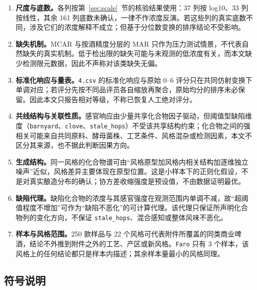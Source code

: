 \documentclass[UTF8,a4paper,zihao=-4]{ctexart}
\numberwithin{figure}{section}
\numberwithin{table}{section}
\numberwithin{equation}{section}
\newcommand{\file}[1]{\texttt{#1}}
\begin{document}
\begin{enumerate}[label=\textbf{\arabic*},leftmargin=3em,itemsep=2pt,topsep=2pt,parsep=0pt]
 
  \item \textbf{尺度与底数。}各列按第~\ref{sec:scale}~节的核验结果使用：37 列按 log10、33 列按线性，其余 161 列底数未确认，一律不作浓度反演。若这些列的真实底数不同，涉及它们的浓度解释不成立；但基于分位数变换的排序结论不受影响。

  \item \textbf{缺失机制。}MCAR 与按酒精度分层的 MAR 只作为压力测试情景，不代表自然缺失的真实机制。低于检出限的缺失可能与未观测的低浓度有关，而本文缺少检测限元数据，因此不声称对该类缺失无偏。

  \item \textbf{标准化响应与量表。}\file{4.csv} 的标准化响应与原始 0--6 评分只在共同仿射变换下单调对应；若评分先按不同品评员各自缩放再聚合，原始均分的排序未必保留。因此本文只报告相对等级，不称已恢复人工绝对评分。

  \item \textbf{共线结构与关联性质。}感官响应由少量共享化合物因子驱动，但阈值型缺陷维度（\file{barnyard}、\file{clove}、\file{stale\_hops}）不受该共享结构约束；化合物之间的强相关可能来自共同原料、酵母菌株、工艺条件、风格混杂或检测因素，本文不区分其来源，也不据此判断因果方向。

  \item \textbf{生成结构。}同一风格的化合物谱可由“风格原型加风格内相关结构加逐维独立噪声”近似，风格差异主要体现在原型位置。这是小样本下的正则化假设，不是对真实酿造分布的确认；协方差收缩强度是预设值，不由数据证明最优。

  \item \textbf{缺陷代理。}缺陷化合物的浓度与其感官强度在观测范围内单调不减，故“超阈值程度不增加”可作为“缺陷不恶化”的可计算代理。该代理只保证所声明化合物列的变化方向，不保证 \file{stale\_hops}、混合感知或整体风味不恶化。
  
  \item \textbf{样本与风格范围。}250 款样品与 22 个风格可代表附件所覆盖的同类商业啤酒，结论不外推到附件之外的工艺、产区或新风格。\file{Faro} 只有 3 个样本，该风格上的任何结论都只是样本内描述；其余样本量最小的风格同理。

\end{enumerate}

\subsection{符号说明}
\end{document}
